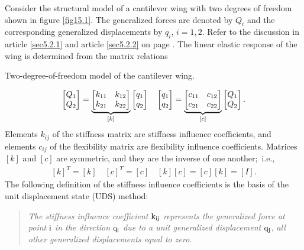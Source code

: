 \documentclass{AeroStructure-ERJohnson}
\begin{document}
\noindent
Consider the structural model of a cantilever wing with two degrees of freedom shown in figure \ref{fig15.1}. The generalized forces are denoted by $Q_{i}$ and the corresponding generalized displacements by $q_{i}$, $i=1,2$. Refer to the discussion in article \ref{sec5.2.1} and article \ref{sec5.2.2} on page \pageref{sec5.2.2}. The linear elastic response of the wing is determined from the matrix relations
{\def\thefigure{15.1}
{\caption{Two-degree-of-freedom model of the cantilever wing.\label{fig15.1}}}
}
\begin{align}\label{eq15.1}
\left[\begin{array}{@{}l@{}}
Q_{1} \\
Q_{2}
\end{array}\right]=\underbrace{\left[\begin{array}{@{}ll@{}} k_{11} & k_{12} \\k_{21} & k_{22}\end{array}\right]}_{[k]}\left[\begin{array}{@{}l@{}}q_{1} \\q_{2}\end{array}\right]\hspace*{1em}
\left[\begin{array}{@{}l@{}} q_{1} \\ q_{2} \end{array}\right]=\underbrace{\left[\begin{array}{@{}ll@{}} c_{11} & c_{12} \\ c_{21} & c_{22} \end{array}\right]}_{[c]}\left[\begin{array}{@{}l@{}} Q_{1} \\ Q_{2} \end{array}\right].
\end{align}
Elements $k_{i j}$ of the stiffness matrix are stiffness influence coefficients, and elements $c_{i j}$ of the flexibility matrix are flexibility influence coefficients. Matrices $[k]$ and $[c]$ are symmetric, and they are the inverse of one another;~i.e.,
\begin{align}\label{eq15.2}
[k]^{T}=[k] \quad[c]^{T}=[c] \quad[k][c]=[c][k]=[I].
\end{align}
The following definition of the stiffness influence coefficients is the basis of the unit displacement state (UDS) method:
\begin{quote}
\textit{The stiffness influence coefficient} ${\rm k}_{\rm ij}$ \textit{represents the generalized force at point} ${\rm i}$ \textit{in the direction} ${\rm q}_{\rm i}$ \textit{due to a unit generalized displacement} ${\rm q}_{\rm j}$, \textit{all other generalized displacements equal to zero.}
\end{quote}
\end{document}
